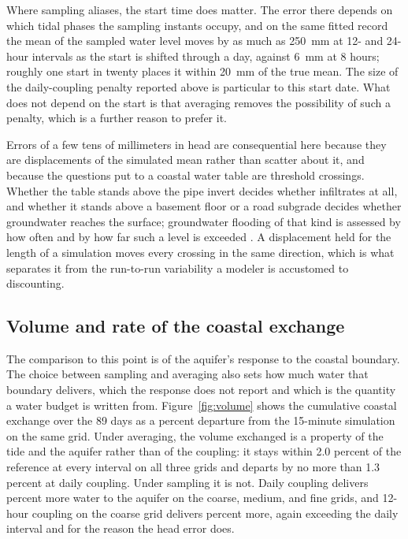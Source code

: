 \documentclass[preprint,authoryear,11pt]{elsarticle}
\begin{document}
Where sampling aliases, the start time does matter. The error there depends on which tidal phases the sampling instants occupy, and on the same fitted record the mean of the sampled water level moves by as much as \SI{250}{\milli\meter} at 12- and 24-hour intervals as the start is shifted through a day, against \SI{6}{\milli\meter} at 8 hours; roughly one start in twenty places it within \SI{20}{\milli\meter} of the true mean. The size of the daily-coupling penalty reported above is particular to this start date. What does not depend on the start is that averaging removes the possibility of such a penalty, which is a further reason to prefer it.

Errors of a few tens of millimeters in head are consequential here because they are displacements of the simulated mean rather than scatter about it, and because the questions put to a coastal water table are threshold crossings. Whether the table stands above the pipe invert decides whether  infiltrates at all, and whether it stands above a basement floor or a road subgrade decides whether groundwater reaches the surface; groundwater flooding of that kind is assessed by how often and by how far such a level is exceeded \citep{liu2021predicting, su2022slr}. A displacement held for the length of a simulation moves every crossing in the same direction, which is what separates it from the run-to-run variability a modeler is accustomed to discounting.

\subsection{Volume and rate of the coastal exchange}

The comparison to this point is of the aquifer's response to the coastal boundary. The choice between sampling and averaging also sets how much water that boundary delivers, which the response does not report and which is the quantity a water budget is written from. Figure~\ref{fig:volume} shows the cumulative coastal exchange over the 89 days as a percent departure from the 15-minute simulation on the same grid. Under averaging, the volume exchanged is a property of the tide and the aquifer rather than of the coupling: it stays within 2.0 percent of the reference at every interval on all three grids and departs by no more than 1.3 percent at daily coupling. Under sampling it is not. Daily coupling delivers  percent more water to the aquifer on the coarse, medium, and fine grids, and 12-hour coupling on the coarse grid delivers  percent more, again exceeding the daily interval and for the reason the head error does.
\end{document}
